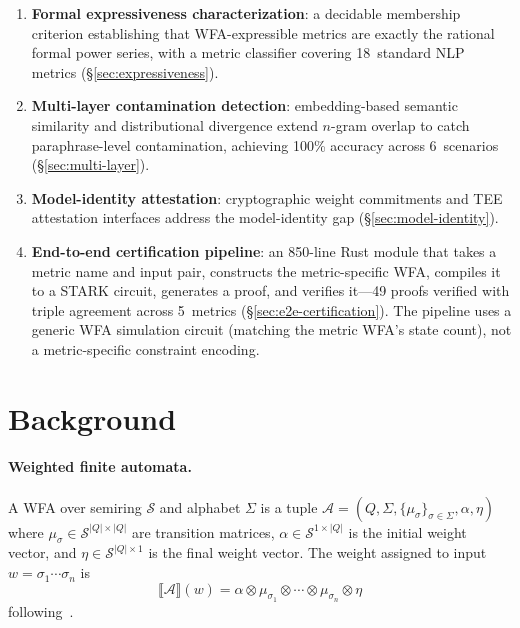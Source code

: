 \documentclass[11pt]{article}
\newcommand{\semiring}[1]{\mathcal{#1}}
\newcommand{\wfa}{\mathcal{A}}
\begin{document}
\begin{enumerate}[leftmargin=*,nosep]
  contribution formalizing Kleene algebras for weighted automata,
  filling a recognized gap between Lean's existing C*-algebraic star
  and the Kleene star needed for formal language
  theory~(\S\ref{sec:limitations}).
\item \textbf{Formal expressiveness characterization}: a decidable
  membership criterion establishing that WFA-expressible metrics are
  exactly the rational formal power series, with a metric classifier
  covering 18~standard NLP metrics (\S\ref{sec:expressiveness}).
\item \textbf{Multi-layer contamination detection}: embedding-based
  semantic similarity and distributional divergence extend $n$-gram
  overlap to catch paraphrase-level contamination, achieving 100\%
  accuracy across 6~scenarios (\S\ref{sec:multi-layer}).
\item \textbf{Model-identity attestation}: cryptographic weight
  commitments and TEE attestation interfaces address the model-identity
  gap (\S\ref{sec:model-identity}).
\item \textbf{End-to-end certification pipeline}: an 850-line Rust
  module that takes a metric name and input pair, constructs the
  metric-specific WFA, compiles it to a STARK circuit, generates a
  proof, and verifies it---49 proofs verified with triple agreement
  across 5~metrics (\S\ref{sec:e2e-certification}).  The pipeline uses a generic WFA
  simulation circuit (matching the metric WFA's state count), not a
  metric-specific constraint encoding.
\end{enumerate}


\section{Background}\label{sec:background}

\paragraph{Weighted finite automata.}
A WFA over semiring $\semiring{S}$ and alphabet $\Sigma$ is a tuple
$\wfa = (Q,\Sigma,\allowbreak \{\mu_\sigma\}_{\sigma\in\Sigma},
\alpha,\eta)$ where
$\mu_\sigma \in \semiring{S}^{|Q|\times|Q|}$ are transition
matrices, $\alpha \in \semiring{S}^{1\times|Q|}$ is the initial
weight vector, and $\eta \in \semiring{S}^{|Q|\times 1}$ is the
final weight vector.  The weight assigned to input
$w = \sigma_1\cdots\sigma_n$ is
\[
\llbracket\wfa\rrbracket(w) = \alpha \otimes \mu_{\sigma_1} \otimes
\cdots \otimes \mu_{\sigma_n} \otimes \eta
\]
following~\cite{schutzenberger1961,droste2009handbook}.
\end{document}
